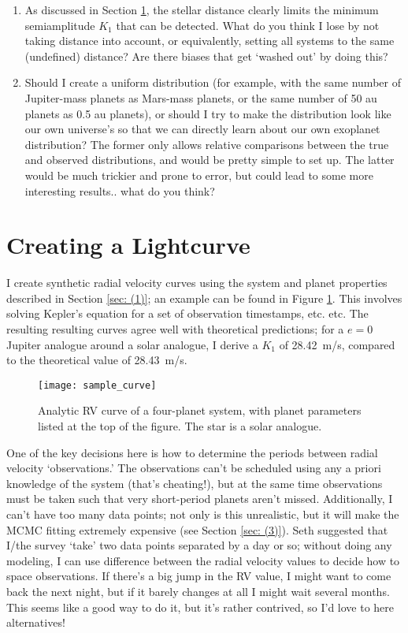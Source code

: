 \documentclass[12pt,modern]{article}
\begin{document}
\begin{enumerate}
  \item As discussed in Section \ref{sec: (2)}, the stellar distance clearly limits the minimum semiamplitude $K_1$ that can be detected. What do you think I lose by not taking distance into account, or equivalently, setting all systems to the same (undefined) distance? Are there biases that get `washed out' by doing this?
  \item Should I create a uniform distribution (for example, with the same number of Jupiter-mass planets as Mars-mass planets, or the same number of 50 au planets as 0.5 au planets), or should I try to make the distribution look like our own universe's so that we can directly learn about our own exoplanet distribution?
  The former only allows relative comparisons between the true and observed distributions, and would be pretty simple to set up. The latter would be much trickier and prone to error, but could lead to some more interesting results.. what do you think?
\end{enumerate}

\section{Creating a Lightcurve}
\label{sec: (2)}

I create synthetic radial velocity curves using the system and planet properties described in Section \ref{sec: (1)}; an example can be found in Figure \ref{fig: sample}. 
This involves solving Kepler's equation for a set of observation timestamps, etc. etc. 
The resulting resulting curves agree well with theoretical predictions; for a $e=0$ Jupiter analogue around a solar analogue, I derive a $K_1$ of \SI{28.42}{m/s}, compared to the theoretical value of \SI{28.43}{m/s}.  

\begin{figure}
  \texttt{[image: sample\_curve]}
  \caption{Analytic RV curve of a four-planet system, with planet parameters listed at the top of the figure. The star is a solar analogue.}
  \label{fig: sample}
\end{figure}

One of the key decisions here is how to determine the periods between radial velocity `observations.' The observations can't be scheduled using any a priori knowledge of the system (that's cheating!), but at the same time observations must be taken such that very short-period planets aren't missed. Additionally, I can't have too many data points; not only is this unrealistic, but it will make the MCMC fitting extremely expensive (see Section \ref{sec: (3)}). Seth suggested that I/the survey `take' two data points separated by a day or so; without doing any modeling, I can use difference between the radial velocity values to decide how to space observations. If there's a big jump in the RV value, I might want to come back the next night, but if it barely changes at all I might wait several months. This seems like a good way to do it, but it's rather contrived, so I'd love to here alternatives!
\end{document}
